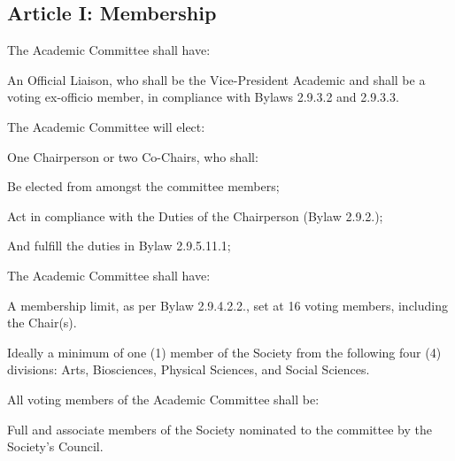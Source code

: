 \subsection{Article I: Membership}
\begin{longenum}[ label*=\thesubsection.\arabic*., align=left] 
\item The Academic Committee shall have:
	\begin{longenum}[ label*=\arabic*., align=left] 
	\item An Official Liaison, who shall be the Vice-President Academic and shall be a voting ex-officio member, in compliance with Bylaws 2.9.3.2 and 2.9.3.3.
	\end{longenum}
\item The Academic Committee will elect:
	\begin{longenum}[ label*=\arabic*., align=left] 
	\item One Chairperson or two Co-Chairs, who shall:
		\begin{longenum}[ label*=\arabic*., align=left] 
		\item Be elected from amongst the committee members;
		\item Act in compliance with the Duties of the Chairperson (Bylaw 2.9.2.);
		\item And fulfill the duties in Bylaw 2.9.5.11.1;
		\end{longenum}
	\end{longenum}
\item The Academic Committee shall have:
	\begin{longenum}[ label*=\arabic*., align=left] 
	\item A membership limit, as per Bylaw 2.9.4.2.2., set at 16 voting members, including the Chair(s).
	\item Ideally a minimum of one (1) member of the Society from the following four (4) divisions: Arts, Biosciences, Physical Sciences, and Social Sciences.
	\end{longenum}
\item All voting members of the Academic Committee shall be:
	\begin{longenum}[ label*=\arabic*., align=left] 
	\item Full and associate members of the Society nominated to the committee by the Society's Council.
	\end{longenum}
\end{longenum}		

